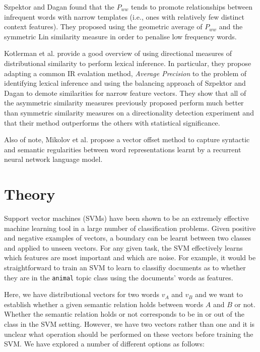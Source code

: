 \documentclass[11pt]{article}
\begin{document}
Szpektor and Dagan  found that the $P_{ww}$ tends to promote relationships between infrequent words with narrow templates (i.e., ones with relatively few distinct context features).  They proposed using the geometric average of $P_{ww}$ and the symmetric Lin similarity measure in order to penalise low frequency words.   

Kotlerman et al.  provide a good overview of using directional measures of distributional similarity to perform lexical inference.  In particular, they propose adapting a common IR evalation method, \emph{Average Precision} to the problem of identifying lexical inference and using the balancing approach of Szpektor and Dagan  to demote similarities for narrow feature vectors.  They show that all of the asymmetric similarity measures previously proposed perform much better than symmetric similarity measures on a directionality detection experiment and that their method outperforms the others with statistical significance.

Also of note, Mikolov et al.  propose a vector offset method to capture syntactic and semantic regularities between word representations learnt by a recurrent neural network language model.

\section{Theory}
\label{sect:theory}
Support vector machines (SVMs) have been shown to be an extremely effective machine learning tool in a large number of classification problems.  Given positive and negative examples of vectors, a boundary can be learnt between two classes and applied to unseen vectors.  For any given task, the SVM effectively learns which features are most important and which are noise.  For example, it would be straightforward to train an SVM to learn to classifiy documents as to whether they are in the \texttt{animal} topic class using the documents' words as features.     

Here, we have distributional vectors for two words $v_A$ and $v_B$ and we want to establish whether a given semantic relation holds between words $A$ and $B$ or not.  Whether the semantic relation holds or not corresponds to be in or out of the class in the SVM setting.  However, we have two vectors rather than one and it is unclear what operation should be performed on these vectors before training the SVM.  We have explored a number of different options as follows:
\end{document}
